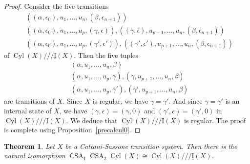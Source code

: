 \documentclass[a4paper,12pt]{amsart}
\newtheorem{thm}{Theorem}[section]
\begin{document}
\begin{proof} 
Consider the five transitions
\begin{align*}
&((\alpha,\epsilon_0),u_1,\dots,u_n,(\beta,\epsilon_{n+1}))\\
&((\alpha,\epsilon_0),u_1,\dots,u_p,(\gamma,\epsilon)),((\gamma,\epsilon),u_{p+1},\dots,u_n,(\beta,\epsilon_{n+1}))\\
&((\alpha,\epsilon_0),u_1,\dots,u_p,(\gamma',\epsilon')),((\gamma',\epsilon'),u_{p+1},\dots,u_n,(\beta,\epsilon_{n+1}))
\end{align*} 
of $\operatorname{{Cyl}}(X)/// \operatorname{\underline{I}}(X)$. Then the five tuples 
\begin{align*}
&(\alpha,u_1,\dots,u_n,\beta)\\
&(\alpha,u_1,\dots,u_p,\gamma),(\gamma,u_{p+1},\dots,u_n,\beta)\\
&(\alpha,u_1,\dots,u_p,\gamma'),(\gamma',u_{p+1},\dots,u_n,\beta)
\end{align*}
are transitions of $X$. Since $X$ is regular, we have
$\gamma=\gamma'$. And since $\gamma=\gamma'$ is an internal state of
$X$, we have $(\gamma,\epsilon)=(\gamma,0)$ and
$(\gamma',\epsilon)=(\gamma',0)$ in $\operatorname{{Cyl}}(X) /// \operatorname{\underline{I}}(X)$. We deduce
that $\operatorname{{Cyl}}(X) /// \operatorname{\underline{I}}(X)$ is regular. The proof is complete using
Proposition~\ref{precalcul0}.  \end{proof}

\begin{thm} \label{precalcul2} Let $X$ be a Cattani-Sassone transition
system. Then there is the natural isomorphism $\operatorname{CSA}_1\operatorname{CSA}_2 \operatorname{{Cyl}}(X)
{\cong} \operatorname{{Cyl}}(X)/// \operatorname{\underline{I}}(X)$.  \end{thm}
\end{document}
